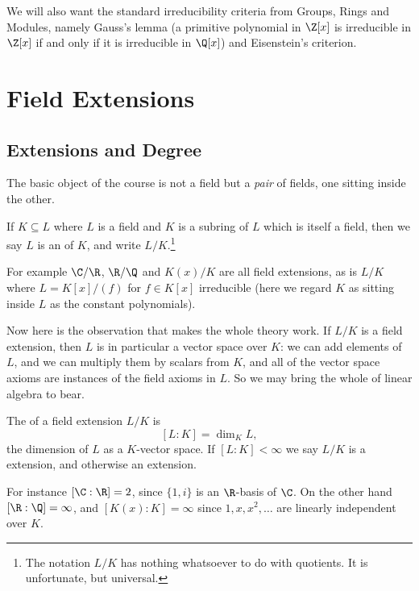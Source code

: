 We will also want the standard irreducibility criteria from Groups, Rings and Modules, namely Gauss's lemma (a primitive polynomial in $\Z[x]$ is irreducible in $\Z[x]$ if and only if it is irreducible in $\Q[x]$) and Eisenstein's criterion.

\section{Field Extensions}

\subsection{Extensions and Degree}

The basic object of the course is not a field but a \emph{pair} of fields, one sitting inside the other.

\begin{definition}
	If $K \subseteq L$ where $L$ is a field and $K$ is a subring of $L$ which is itself a field, then we say $L$ is an  of $K$, and write $L/K$.\footnote{The notation $L/K$ has nothing whatsoever to do with quotients. It is unfortunate, but universal.}
\end{definition}

For example $\C/\R$, $\R/\Q$ and $K(x)/K$ are all field extensions, as is $L/K$ where $L = K[x]/(f)$ for $f \in K[x]$ irreducible (here we regard $K$ as sitting inside $L$ as the constant polynomials).

Now here is the observation that makes the whole theory work. If $L/K$ is a field extension, then $L$ is in particular a vector space over $K$: we can add elements of $L$, and we can multiply them by scalars from $K$, and all of the vector space axioms are instances of the field axioms in $L$. So we may bring the whole of linear algebra to bear.

\begin{definition}[Degree]
	The  of a field extension $L/K$ is
	$$[L : K] = \dim_K L,$$
	the dimension of $L$ as a $K$-vector space. If $[L:K] < \infty$ we say $L/K$ is a  extension, and otherwise an  extension.
\end{definition}

For instance $[\C : \R] = 2$, since $\{1, i\}$ is an $\R$-basis of $\C$. On the other hand $[\R : \Q] = \infty$, and $[K(x) : K] = \infty$ since $1, x, x^2, \dots$ are linearly independent over $K$.

